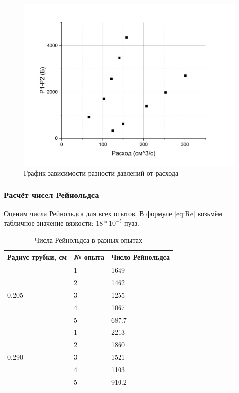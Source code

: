 \documentclass[a4paper]{article}
\begin{document}
\begin{figure}[htbp]
		\includegraphics[scale=0.25]{2.jpg}
	\caption{График зависимости разности давлений от расхода}
	\label{fig:Dp}
\end{figure}

\subsubsection{Расчёт чисел Рейнольдса}

Оценим числа Рейнольдса для всех опытов. В формуле \ref{eq:Re} возьмём табличное значение вязкости: $18*10^{-5}$ пуаз.

\begin{table}[htbp]
\centering
\begin{tabular}{|l|l|l|}
\hline
Радиус трубки, см      & № опыта & Число Рейнольдса \\ \hline
\multirow{5}{*}{0.205} & 1       & 1649             \\ \cline{2-3} 
                       & 2       & 1462             \\ \cline{2-3} 
                       & 3       & 1255             \\ \cline{2-3} 
                       & 4       & 1067             \\ \cline{2-3} 
                       & 5       & 687.7            \\ \hline
\multirow{5}{*}{0.290} & 1       & 2213             \\ \cline{2-3} 
                       & 2       & 1860             \\ \cline{2-3} 
                       & 3       & 1521             \\ \cline{2-3} 
                       & 4       & 1103             \\ \cline{2-3} 
                       & 5       & 910.2            \\ \hline
\end{tabular}
\label{tab:Re}
\caption{Числа Рейнольдса в разных опытах}
\end{table}
\end{document}
